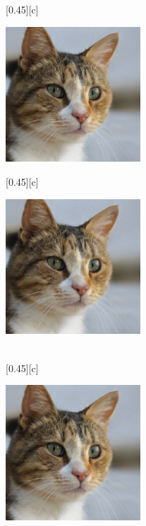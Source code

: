 \documentclass[12pt,a4paper,UTF8]{article}
\begin{document}
    \begin{figure}[!htbp]
        \centering
        [0.45\textwidth][c]{
            \centering
            \includegraphics[width=0.45\textwidth]{example}
             
        }%
        \hspace*{0.1cm}
        [0.45\textwidth][c]{
            \centering
            \includegraphics[width=0.45\textwidth]{example}
             
        }\\%
        [0.45\textwidth][c]{
            \centering
            \includegraphics[width=0.45\textwidth]{example}
             
}
\end{figure}
\end{document}

